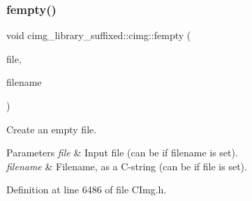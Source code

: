 \subsubsection{\texorpdfstring{fempty()}{fempty()}}
{\footnotesize\ttfamily void cimg\+\_\+library\+\_\+suffixed\+::cimg\+::fempty (\begin{DoxyParamCaption}\item[{std\+::\+F\+I\+LE $\ast$const}]{file,  }\item[{const \hyperlink{classchar}{char} $\ast$const}]{filename }\end{DoxyParamCaption})\hspace{0.3cm}{\ttfamily [inline]}}



Create an empty file. 


\begin{DoxyParams}{Parameters}
{\em file} & Input file (can be {} if {\ttfamily filename} is set). \\
\hline
{\em filename} & Filename, as a C-\/string (can be {} if {\ttfamily file} is set). \\
\hline
\end{DoxyParams}


Definition at line 6486 of file C\+Img.\+h.



